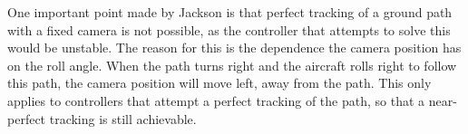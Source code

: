 One important point made by Jackson is that perfect tracking of a ground path with a fixed camera is not possible, as the controller that attempts to solve this would be unstable. The reason for this is the dependence the camera position has on the roll angle. When the path turns right and the aircraft rolls right to follow this path, the camera position will move left, away from the path. This only applies to controllers that attempt a perfect tracking of the path, so that a near-perfect tracking is still achievable.